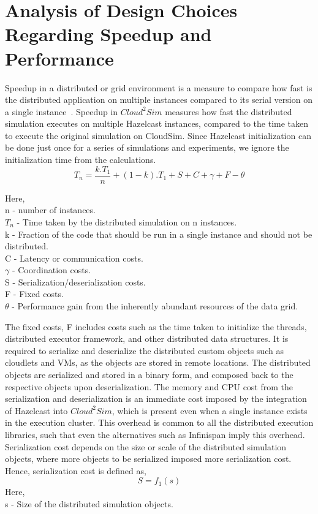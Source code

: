 \section{Analysis of Design Choices Regarding Speedup and Performance}
\label{sec:3perf}
Speedup in a distributed or grid environment is a measure to compare how fast is the distributed application on multiple instances compared to its serial version on a single instance~\cite{hoekstra2005introducing}. Speedup in $Cloud^{2}Sim$ measures how fast the distributed simulation executes on multiple Hazelcast instances, compared to the time taken to execute the original simulation on CloudSim. Since Hazelcast initialization can be done just once for a series of simulations and experiments, we ignore the initialization time from the calculations.
\begin{equation} \label{eq:initequation}
T_{n} = \frac{k.T_{1}}{n} + (1-k).T_{1} + S + C + \gamma + F - \theta
\end{equation}

Here,\\
n - number of instances.\\
$T_{n}$ - Time taken by the distributed simulation on n instances.\\
k - Fraction of the code that should be run in a single instance and should not be distributed.\\
C - Latency or communication costs.\\
$\gamma$ - Coordination costs.\\
S - Serialization/deserialization costs.\\
F - Fixed costs.\\
$\theta$ - Performance gain from the inherently abundant resources of the data grid.

The fixed costs, F includes costs such as the time taken to initialize the threads, distributed executor framework, and other distributed data structures. It is required to serialize and deserialize the distributed custom objects such as cloudlets and VMs, as the objects are stored in remote locations. The distributed objects are serialized and stored in a binary form, and composed back to the respective objects upon deserialization. The memory and CPU cost from the serialization and deserialization is an immediate cost imposed by the integration of Hazelcast into $Cloud^{2}Sim$, which is present even when a single instance exists in the execution cluster. This overhead is common to all the distributed execution libraries, such that even the alternatives such as Infinispan imply this overhead. Serialization cost depends on the size or scale of the distributed simulation objects, where more objects to be serialized imposed more serialization cost. Hence, serialization cost is defined as,
\begin{equation} \label{eq:sc}
S = f_{1}(s)
\end{equation}
Here,\\
s - Size of the distributed simulation objects.\\

